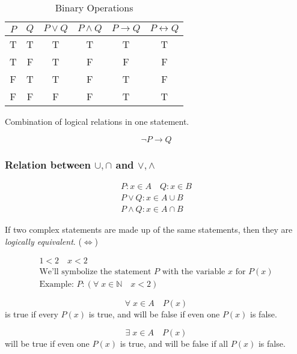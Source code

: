 \documentclass[00_complete]{subfiles}
\begin{document}
\begin{table}[ht!]
\centering
{
\begin{tabular}{cc|cccc}
 \hline
 $P$ & $Q$ & $P \lor Q$ & $P \land Q$ & $P \to Q$ & $P\leftrightarrow Q$ \\
 \hline
 T & T & T & T & T & T\\
 T & F & T & F & F & F\\
 F & T & T & F & T & F\\
 F & F & F & F & T & T\\
 \hline
\end{tabular}}
\caption{Binary Operations}
\end{table}

\begin{definition}
Combination of logical relations in one statement.
\begin{example}
    $$\neg P \to Q$$
\end{example}
\end{definition}

\subsubsection{Relation between $\cup, \cap$ and $\lor, \land$}
\begin{gather*}
    P : x \in A \quad Q: x \in B \\
    P \lor Q : x \in A \cup B \\
    P \land Q: x \in A \cap B
\end{gather*}

\begin{definition}
If two complex statements are made up of the same statements, then they are
\emph{logically equivalent}. ($\iff$)
\end{definition}

\begin{gather*}
    1<2 \quad x<2 \\
    \text{We'll symbolize the statement $P$ with the variable $x$ for $P(x)$} \\
    \text{Example: }P: (\forall \; x \in \mathbb{N} \quad x<2)
\end{gather*}

$$\forall \; x \in A \quad P(x)$$
is true if every $P(x)$ is true, and will be false if even one $P(x)$ is false.

$$\exists \; x \in A \quad P(x)$$
will be true if even one $P(x)$ is true, and will be false if all $P(x)$ is false.
\end{document}
